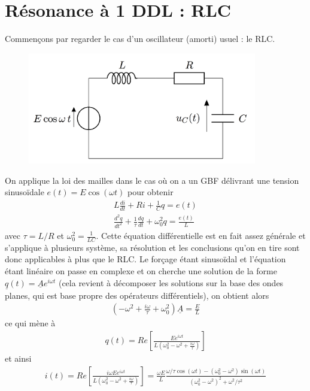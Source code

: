\documentclass[12pt,prb,aps,epsf]{article}
\begin{document}
\section{Résonance à 1 DDL : RLC}
Commençons par regarder le cas d'un oscillateur (amorti) usuel : le RLC.\\
\begin{figure}[h]
	\centering \includegraphics[width=10cm]{RLC}
\end{figure}
On applique la loi des mailles dans le cas où on a un GBF délivrant une tension sinusoïdale $e(t) = E\cos(\omega t)$ pour obtenir
\begin{eqnarray}
L\frac{d i}{dt} + Ri + \frac{1}{C}q = e(t)\\
\frac{d^2q}{dt^2} + \frac{1}{\tau}\frac{dq}{dt} + \omega_0^2q = \frac{e(t)}{L}
\end{eqnarray}
avec $\tau = L/R$ et $\omega_0^2 = \frac{1}{LC}$. Cette équation différentielle est en fait assez générale et s'applique à plusieurs système, sa résolution et les conclusions qu'on en tire sont donc applicables à plus que le RLC. Le forçage étant sinusoïdal et l'équation étant linéaire on passe en complexe et on cherche une solution de la forme $\underline{q}(t) = \underline{A}e^{i\omega t}$ (cela revient à décomposer les solutions sur la base des ondes planes, qui est base propre des opérateurs différentiels), on obtient alors 
\begin{eqnarray}
\left(-\omega ^2 + \frac{i\omega}{\tau} + \omega_0^2\right) \underline{A} = \frac{E}{L}
\end{eqnarray}
ce qui mène à 
\begin{eqnarray}
q(t) = Re\left[\frac{Ee^{i\omega t}}{L\left(\omega_0^2-\omega ^2 + \frac{i\omega}{\tau} \right)}\right]
\end{eqnarray}
et ainsi 
\begin{eqnarray}
i(t) = Re\left[\frac{i\omega Ee^{i\omega t}}{L\left(\omega_0^2-\omega ^2 + \frac{i\omega}{\tau} \right)}\right] = \frac{\omega E}{L}\frac{\omega/\tau \cos(\omega t) - (\omega_0^2-\omega^2) \sin(\omega t) }{(\omega_0^2-\omega^2)^2 + \omega^2/\tau^2}
\end{eqnarray}
\end{document}
